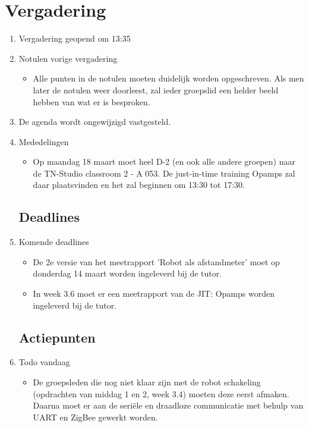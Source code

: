 \documentclass{article}
\begin{document}
\section*{Vergadering}
\begin{enumerate}
	
\subsection*{Vooraf}
\item Vergadering geopend om 13:35

\item Notulen vorige vergadering
\begin{itemize}
\item Alle punten in de notulen moeten duidelijk worden opgeschreven. Als men later de notulen weer doorleest, zal ieder groepslid een helder beeld hebben van wat er is besproken.
\end{itemize}

\item De agenda wordt ongewijzigd vastgesteld.
\item Mededelingen
\begin{itemize}
\item Op maandag 18 maart moet heel D-2 (en ook alle andere groepen) naar de TN-Studio classroom 2 - A 053. De just-in-time training Opamps zal daar plaatsvinden en het zal beginnen om 13:30 tot 17:30.
\end{itemize}

\subsection*{Deadlines}
\item Komende deadlines
\begin{itemize}
\item De 2e versie van het meetrapport 'Robot als afstandmeter' moet op donderdag 14 maart worden ingeleverd bij de tutor.
\item In week 3.6 moet er een meetrapport van de JIT: Opamps worden ingeleverd bij de tutor. 
\end{itemize}

\subsection*{Actiepunten}
\item Todo vandaag
\begin{itemize}
\item De groepsleden die nog niet klaar zijn met de robot schakeling (opdrachten van middag 1 en 2, week 3.4) moeten deze eerst afmaken. Daarna moet er aan de seriële en draadloze communicatie met behulp van UART en ZigBee gewerkt worden. 
\end{itemize}


\end{enumerate}
\end{document}
